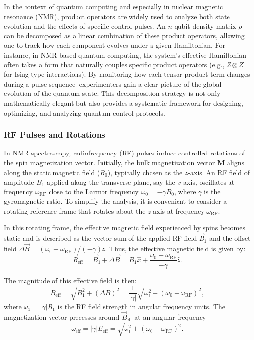 \documentclass[%
 reprint,
 amsmath,amssymb,
 aps,
]{revtex4-2}
\begin{document}
In the context of quantum computing and especially in nuclear magnetic resonance (NMR), product operators are widely used to analyze both state evolution and the effects of specific control pulses. An $n$-qubit density matrix $\rho$ can be decomposed as a linear combination of these product operators, allowing one to track how each component evolves under a given Hamiltonian. For instance, in NMR-based quantum computing, the system's effective Hamiltonian often takes a form that naturally couples specific product operators (e.g., $Z \otimes Z$ for Ising-type interactions). By monitoring how each tensor product term changes during a pulse sequence, experimenters gain a clear picture of the global evolution of the quantum state. This decomposition strategy is not only mathematically elegant but also provides a systematic framework for designing, optimizing, and analyzing quantum control protocols.

\subsubsection{RF Pulses and Rotations}
In NMR spectroscopy, radiofrequency (RF) pulses induce controlled rotations of the spin magnetization vector. Initially, the bulk magnetization vector $\mathbf{M}$ aligns along the static magnetic field ($B_0$), typically chosen as the $z$-axis. An RF field of amplitude $B_1$ applied along the transverse plane, say the $x$-axis, oscillates at frequency $\omega_{\text{RF}}$ close to the Larmor frequency $\omega_0 = -\gamma B_0$, where $\gamma$ is the gyromagnetic ratio. To simplify the analysis, it is convenient to consider a rotating reference frame that rotates about the $z$-axis at frequency $\omega_{\text{RF}}$. 

In this rotating frame, the effective magnetic field experienced by spins becomes static and is described as the vector sum of the applied RF field $\vec{B}_1$ and the offset field $\Delta \vec{B} = (\omega_0 - \omega_{\text{RF}})/(-\gamma)\hat{z}$. Thus, the effective magnetic field is given by:
\[
\vec{B}_{\text{eff}} = \vec{B}_1 + \Delta \vec{B} = B_1 \hat{x} + \frac{\omega_0 - \omega_{\text{RF}}}{-\gamma}\hat{z}.
\]

The magnitude of this effective field is then:
\[
B_{\text{eff}} = \sqrt{B_1^2 + (\Delta B)^2} = \frac{1}{|\gamma|}\sqrt{\omega_1^2 + (\omega_0 - \omega_{\text{RF}})^2},
\]
where $\omega_1 = |\gamma| B_1$ is the RF field strength in angular frequency units. The magnetization vector precesses around $\vec{B}_{\text{eff}}$ at an angular frequency
\[
\omega_{\text{eff}} = |\gamma| B_{\text{eff}} = \sqrt{\omega_1^2 + (\omega_0 - \omega_{\text{RF}})^2}.
\]
\end{document}
